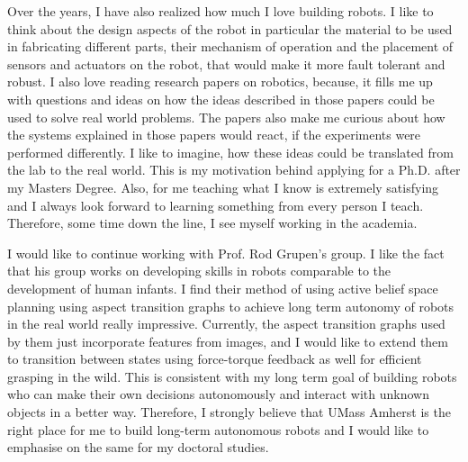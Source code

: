 \documentclass[11pt]{article}
\newcommand{\statement}[1]{\par\medskip
  \textcolor{blue}{\textbf{#1:}}\space
}
\begin{document}
\par
\justify
 Over the years, I have also realized how much I love building robots. I like to think about the design aspects of the robot in particular the material to be used in fabricating different parts, their mechanism of operation and the placement of sensors and actuators on the robot, that would make it more fault tolerant and robust.  I also love reading research papers on robotics, because, it fills me up with questions and ideas on how the ideas described in those papers could be used to solve real world problems. The papers also make me curious about how the systems explained in those papers would react, if the experiments were performed differently. I like to imagine, how these ideas could be translated from the lab to the real world. This is my motivation behind applying for a Ph.D. after my Masters Degree. Also, for me teaching what I know is extremely satisfying and I always look forward to learning something from every person I teach. Therefore, some time down the line, I see myself working in the academia. 
 \par
 \justify
 I would like to continue working with Prof. Rod Grupen's group. I like the fact that his group works on developing skills in robots comparable to the development of human infants. I find their method of using active belief space planning using aspect transition graphs to achieve long term autonomy of robots in the real world really impressive. Currently, the aspect transition graphs used by them just incorporate features from images, and I would like to extend them to transition between states using force-torque feedback as well for efficient grasping in the wild. This is consistent with my long term goal of building robots who can make their own decisions autonomously and interact with unknown objects in a better way. Therefore, I strongly believe that UMass Amherst is the right place for me to build long-term autonomous robots and I would like to emphasise on the same for my doctoral studies. 










%
%
\end{document}
